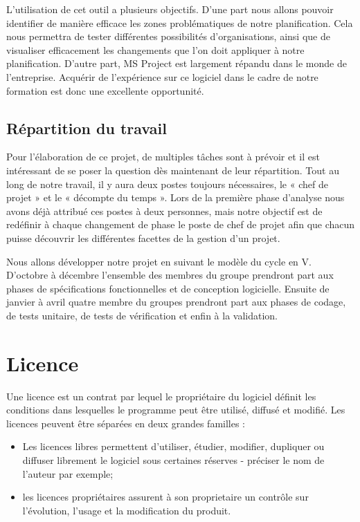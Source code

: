 	L'utilisation de cet outil a plusieurs objectifs. D'une part nous allons pouvoir identifier de manière efficace les zones problématiques de notre planification. Cela nous permettra de tester différentes possibilités d'organisations, ainsi que de visualiser efficacement les changements que l'on doit appliquer à notre planification. D'autre part, MS Project est largement répandu dans le monde de l'entreprise.  Acquérir de l'expérience sur ce logiciel dans le cadre de notre formation est donc une excellente opportunité.


\subsection{Répartition du travail}
	Pour l'élaboration de ce projet, de multiples tâches sont à prévoir et il est intéressant de se poser la question dès maintenant de leur répartition. Tout au long de notre travail, il y aura deux postes toujours nécessaires, le « chef de projet » et le « décompte du temps ». Lors de la première phase d'analyse nous avons déjà attribué ces postes à deux personnes, mais notre objectif est de redéfinir à chaque changement de phase le poste de chef de projet afin que chacun puisse découvrir les différentes facettes de la gestion d'un projet.  

	Nous allons développer notre projet en suivant le modèle du cycle en V. D'octobre à décembre l'ensemble des membres du groupe prendront part aux phases de spécifications fonctionnelles et de conception logicielle. Ensuite de janvier à avril quatre membre du groupes prendront part aux phases de codage, de tests unitaire, de tests de vérification et enfin à la validation.


\section{Licence}

	Une licence est un contrat par lequel le propriétaire du logiciel définit les conditions dans lesquelles le programme peut être utilisé, diffusé et modifié. Les licences peuvent être séparées en deux grandes familles :
	\begin{itemize}
		\item Les licences libres permettent d'utiliser, étudier, modifier, dupliquer ou diffuser librement le logiciel sous certaines réserves - préciser le nom de l'auteur par exemple;
		\item les licences propriétaires assurent à son proprietaire un contrôle sur l'évolution, l'usage et la modification du produit.
	\end{itemize}


